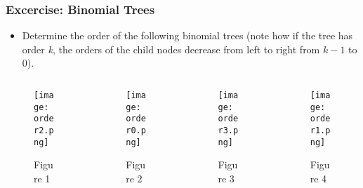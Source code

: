 \documentclass[13pt]{beamer}
\begin{document}
\begin{frame}
\frametitle{Excercise: Binomial Trees}
  \begin{itemize}
    \item Determine the order of the following binomial trees (note how if the tree has order \textit{k}, the orders of the child nodes decrease from left to right from $k-1$ to $0$).
  \end{itemize}

  \begin{columns}[T] %
    \begin{column}[T]{3.3cm} %
      \begin{figure}
        \caption{Figure 1}
        \texttt{[image: order2.png]}
      \end{figure}
      \centering
    \end{column}
    \begin{column}[T]{3.3cm} %
      \begin{figure}
        \caption{Figure 2}
        \texttt{[image: order0.png]}
      \end{figure}
    \end{column}
    \begin{column}[T]{3.3cm} %
      \begin{figure}
        \caption{Figure 3}
        \texttt{[image: order3.png]}
      \end{figure}
      \centering
    \end{column}
    \begin{column}[T]{3.3cm} %
      \begin{figure}
        \caption{Figure 4}
        \texttt{[image: order1.png]}
      \end{figure}
    \end{column}
  \end{columns}

\end{frame}
\end{document}

